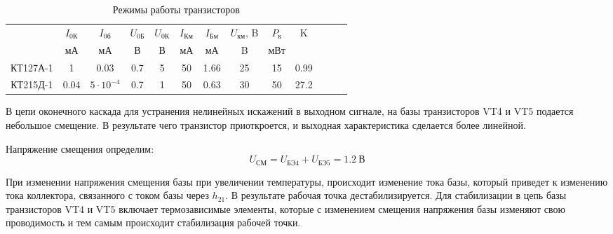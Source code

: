 \begin{table}[htbp]
\caption{Режимы работы транзисторов}
\begin{center}\begin{tabular}{|c|c|c|c|c|c|c|c|c|c|c|c|c|}
\hline 
   & $I_\text{0К}$ & $I_\text{0б}$& $U_\text{0Б}$ & $U_\text{0К}$&  $I_{\text{Км}}$  & $I_{\text{Бм}}$& $U_{\text{км}}$, B & $P_{\text{к}}$ & K\\ 
  & мА & мА& В & В & мА & мА & B & мВт & \\
\hline 
КТ127А-1 & 1 & 0.03 & 0.7 & 5 & 50 & 1.66 & 25 & 15 & 0.99 \\
\hline 
КТ215Д-1 & 0.04 & $5\cdot10^{-4}$  & 0.7 & 1 & 50 & 0.63 & 30 & 50 & 27.2 \\
\hline
\end{tabular} 
\end{center}
\end{table}

В цепи оконечного каскада для устранения нелинейных искажений в выходном сигнале, на базы транзисторов VT4 и VT5 подается небольшое смещение. В результате чего транзистор приоткроется, и выходная характеристика сделается более линейной. \par
Напряжение смещения определим:
\begin{equation}
\label{eq:equation2_23}
 U_{\text{СМ}} = U_{\text{БЭ4}} + U_{\text{БЭ5}} = 1.2~В                                         
\end{equation}

При изменении напряжения смещения базы при увеличении температуры, происходит изменение тока базы, который приведет к изменению тока коллектора, связанного с током базы через $h_{21}$. В результате рабочая точка дестабилизируется. Для стабилизации в цепь базы транзисторов VT4 и VT5 включает термозависимые элементы, которые с изменением смещения напряжения базы изменяют свою проводимость и тем самым происходит стабилизация рабочей точки.
